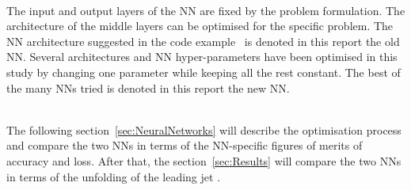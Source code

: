 \ \\The input and output layers of the NN are fixed by the problem formulation. The architecture of the middle layers can be optimised for the specific problem. The NN architecture suggested in the code example~\cite{AGlazovCode} is denoted in this report the old NN. Several architectures and NN hyper-parameters have been optimised in this study by changing one parameter while keeping all the rest constant. The best of the many NNs tried is denoted in this report the new NN. 

\ \\The following section~\ref{sec:NeuralNetworks} will describe the optimisation process and compare the two NNs in terms of the NN-specific figures of merits of accuracy and loss. After that, the section~\ref{sec:Results} will compare the two NNs in terms of the unfolding of the leading jet \pt.

\clearpage
